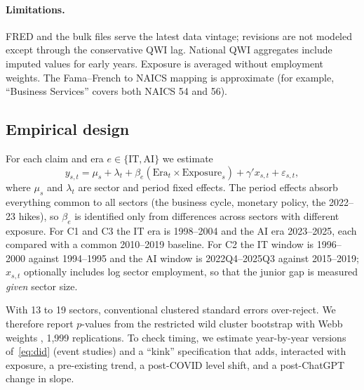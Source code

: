\paragraph{Limitations.} FRED and the bulk files serve the latest data vintage; revisions are not modeled except through the conservative QWI lag. National QWI aggregates include imputed values for early years. Exposure is averaged without employment weights. The Fama--French to NAICS mapping is approximate (for example, ``Business Services'' covers both NAICS 54 and 56).

\subsection{Empirical design}
\label{sec:design}

For each claim and era $e \in \{\text{IT}, \text{AI}\}$ we estimate
\begin{equation}
  y_{s,t} = \mu_s + \lambda_t + \beta_e \left(\text{Era}_t \times \text{Exposure}_s\right) + \gamma' x_{s,t} + \varepsilon_{s,t},
  \label{eq:did}
\end{equation}
where $\mu_s$ and $\lambda_t$ are sector and period fixed effects. The period effects absorb everything common to all sectors (the business cycle, monetary policy, the 2022--23 hikes), so $\beta_e$ is identified only from differences across sectors with different exposure. For C1 and C3 the IT era is 1998--2004 and the AI era 2023--2025, each compared with a common 2010--2019 baseline. For C2 the IT window is 1996--2000 against 1994--1995 and the AI window is 2022Q4--2025Q3 against 2015--2019; $x_{s,t}$ optionally includes log sector employment, so that the junior gap is measured \emph{given} sector size.

With 13 to 19 sectors, conventional clustered standard errors over-reject. We therefore report $p$-values from the restricted wild cluster bootstrap with Webb weights \citep{cameron2008bootstrap, webb2023reworking}, 1,999 replications. To check timing, we estimate year-by-year versions of~\eqref{eq:did} (event studies) and a ``kink'' specification that adds, interacted with exposure, a pre-existing trend, a post-COVID level shift, and a post-ChatGPT change in slope.
